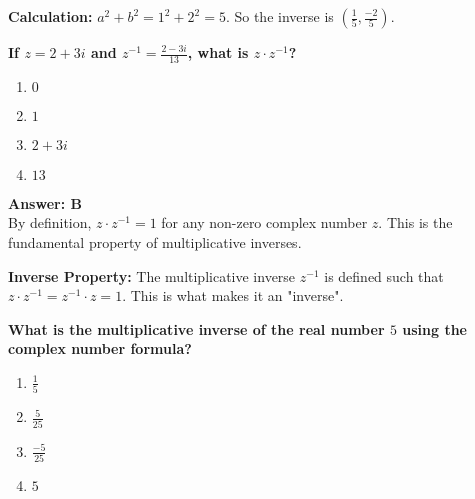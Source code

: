 \documentclass[12pt,a4paper]{article}
\begin{document}
\begin{conceptbox}
\textbf{Calculation:} \( a^2 + b^2 = 1^2 + 2^2 = 5 \). So the inverse is \( \left(\frac{1}{5}, \frac{-2}{5}\right) \).
\end{conceptbox}

\newpage
\begin{questiontitle}[MCQ 64]
\textbf{If \( z = 2 + 3i \) and \( z^{-1} = \frac{2 - 3i}{13} \), what is \( z \cdot z^{-1} \)?}
\end{questiontitle}

\begin{partbox}[Options]
\begin{enumerate}[label=\Alph*.]
    \item \( 0 \)
    \item \( 1 \)
    \item \( 2 + 3i \)
    \item \( 13 \)
\end{enumerate}
\end{partbox}

\begin{answerstyle}
\textbf{Answer: B} \\
By definition, \( z \cdot z^{-1} = 1 \) for any non-zero complex number \( z \). This is the fundamental property of multiplicative inverses.
\end{answerstyle}

\begin{conceptbox}
\textbf{Inverse Property:} The multiplicative inverse \( z^{-1} \) is defined such that \( z \cdot z^{-1} = z^{-1} \cdot z = 1 \). This is what makes it an "inverse".
\end{conceptbox}

\newpage
\begin{questiontitle}[MCQ 65]
\textbf{What is the multiplicative inverse of the real number \( 5 \) using the complex number formula?}
\end{questiontitle}

\begin{partbox}[Options]
\begin{enumerate}[label=\Alph*.]
    \item \( \frac{1}{5} \)
    \item \( \frac{5}{25} \)
    \item \( \frac{-5}{25} \)
    \item \( 5 \)
\end{enumerate}
\end{partbox}
\end{document}
